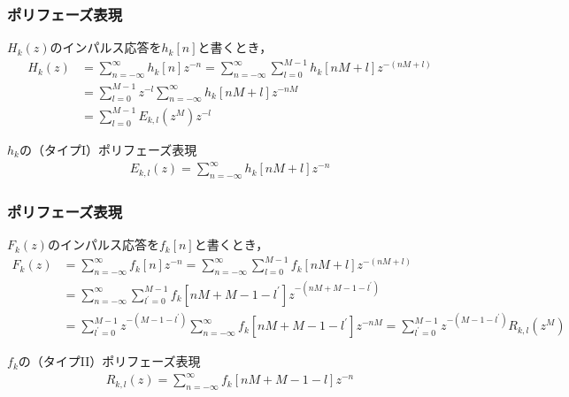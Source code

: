 \documentclass[14pt,xcolor=dvipsnames,table,dvipdfmx]{beamer}
\begin{document}
\begin{frame}[c]
    \frametitle{ポリフェーズ表現}
    $H_{k}(z)$のインパルス応答を$h_{k}[n]$と書くとき，
    \small
    \begin{align*}
        H_{k}(z) &= \sum_{n = -\infty}^{\infty} h_{k}[n] z^{-n} = \sum_{n = -\infty}^{\infty} \sum_{l = 0}^{M - 1} h_{k}[nM + l] z^{-(nM+l)} \\
        &= \sum_{l = 0}^{M - 1} z^{-l} \sum_{n = -\infty}^{\infty}h_{k}[nM + l] z^{-nM} \\
        &= \sum_{l = 0}^{M - 1} E_{k,l}(z^{M}) z^{-l}
    \end{align*}
    \normalsize
    \begin{block}{$h_{k}$の（タイプI）ポリフェーズ表現}
        \vspace{-13pt}
        \begin{align}
            E_{k,l}(z) = \sum_{n = -\infty}^{\infty} h_{k}[nM + l] z^{-n} \label{eq:type1_polyphase_representation}
        \end{align}
    \end{block}
\end{frame}

\begin{frame}[c]
    \frametitle{ポリフェーズ表現}
    $F_{k}(z)$のインパルス応答を$f_{k}[n]$と書くとき，
    \scriptsize
    \begin{align*}
        F_{k}(z) &= \sum_{n = -\infty}^{\infty} f_{k}[n] z^{-n} = \sum_{n = -\infty}^{\infty} \sum_{l = 0}^{M - 1} f_{k}[nM + l] z^{-(nM+l)} \\
        &= \sum_{n = -\infty}^{\infty} \sum_{l^{\prime} = 0}^{M - 1} f_{k}[nM + M - 1 - l^{\prime}] z^{-(nM + M - 1 - l^{\prime})} \\
        &= \sum_{l^{\prime} = 0}^{M - 1} z^{-(M - 1 - l^{\prime})} \sum_{n = -\infty}^{\infty} f_{k}[nM + M - 1 - l^{\prime}] z^{-nM} = \sum_{l^{\prime} = 0}^{M - 1} z^{-(M - 1 - l^{\prime})} R_{k,l}(z^{M})
    \end{align*}
    \normalsize
    \begin{block}{$f_{k}$の（タイプII）ポリフェーズ表現}
        \vspace{-13pt}
        \begin{align}
            R_{k,l}(z) = \sum_{n = -\infty}^{\infty} f_{k}[nM + M - 1 - l] z^{-n} \label{eq:type2_polyphase_representation}
        \end{align}
    \end{block}
\end{frame}
\end{document}
